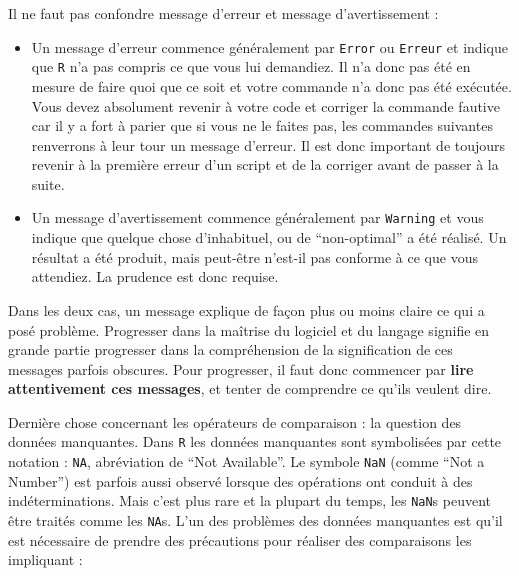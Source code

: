 \documentclass[
  a4paper,
  DIV=11,
  numbers=noendperiod,
  oneside]{scrreprt}
\providecommand{\tightlist}{%
  \setlength{\itemsep}{0pt}\setlength{\parskip}{0pt}}\usepackage{longtable,booktabs,array}
\begin{document}
\begin{tcolorbox}[enhanced jigsaw, coltitle=black, toprule=.15mm, opacityback=0, breakable, colback=white, opacitybacktitle=0.6, colframe=quarto-callout-warning-color-frame, leftrule=.75mm, rightrule=.15mm, titlerule=0mm, bottomtitle=1mm, toptitle=1mm, arc=.35mm, title=\textcolor{quarto-callout-warning-color}{\faExclamationTriangle}\hspace{0.5em}{Erreur ou avertissement ? \faIcon{bomb} ou \faIcon{exclamation-triangle}
?}, colbacktitle=quarto-callout-warning-color!10!white, bottomrule=.15mm, left=2mm]

Il ne faut pas confondre message d'erreur et message d'avertissement :

\begin{itemize}
\tightlist
\item
  Un message d'{erreur} commence généralement par \texttt{Error} ou
  \texttt{Erreur} et indique que \texttt{R} n'a pas compris ce que vous
  lui demandiez. Il n'a donc pas été en mesure de faire quoi que ce soit
  et votre commande n'a donc pas été exécutée. Vous devez absolument
  revenir à votre code et corriger la commande fautive car il y a fort à
  parier que si vous ne le faites pas, les commandes suivantes
  renverrons à leur tour un message d'erreur. Il est donc important de
  toujours revenir à la première erreur d'un script et de la corriger
  avant de passer à la suite.
\item
  Un message d'{avertissement} commence généralement par
  \texttt{Warning} et vous indique que quelque chose d'inhabituel, ou de
  ``non-optimal'' a été réalisé. Un résultat a été produit, mais
  peut-être n'est-il pas conforme à ce que vous attendiez. La prudence
  est donc requise.
\end{itemize}

Dans les deux cas, un message explique de façon plus ou moins claire ce
qui a posé problème. Progresser dans la maîtrise du logiciel et du
langage signifie en grande partie progresser dans la compréhension de la
signification de ces messages parfois obscures. Pour progresser, il faut
donc commencer par \textbf{lire attentivement ces messages}, et tenter
de comprendre ce qu'ils veulent dire.

\end{tcolorbox}

Dernière chose concernant les opérateurs de comparaison : la question
des données manquantes. Dans \texttt{R} les données manquantes sont
symbolisées par cette notation : \texttt{NA}, abréviation de ``Not
Available''. Le symbole \texttt{NaN} (comme ``Not a Number'') est
parfois aussi observé lorsque des opérations ont conduit à des
indéterminations. Mais c'est plus rare et la plupart du temps, les
\texttt{NaN}s peuvent être traités comme les \texttt{NA}s. L'un des
problèmes des données manquantes est qu'il est nécessaire de prendre des
précautions pour réaliser des comparaisons les impliquant :
\end{document}
